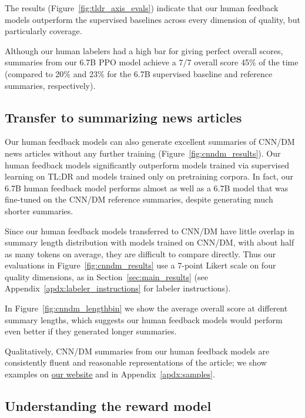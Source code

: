 The results (Figure~\ref{fig:tldr_axis_evals}) indicate that our human feedback models outperform the supervised baselines across every dimension of quality, but particularly coverage. 

Although our human labelers had a high bar for giving perfect overall scores, summaries from our 6.7B PPO model achieve a 7/7 overall score 45\% of the time (compared to 20\% and 23\% for the 6.7B supervised baseline and reference summaries, respectively). 

\subsection{Transfer to summarizing news articles}
\label{sec:cnndm}

Our human feedback models can also generate excellent summaries of CNN/DM news articles without any further training (Figure~\ref{fig:cnndm_results}). 
Our human feedback models significantly outperform models trained via supervised learning on TL;DR and models trained only on pretraining corpora. In fact, our 6.7B human feedback model performs almost as well as a 6.7B model that was fine-tuned on the CNN/DM reference summaries, despite generating much shorter summaries.

Since our human feedback models transferred to CNN/DM  have little overlap in summary length distribution with models trained on CNN/DM, with about half as many tokens on average, they are difficult to compare directly. Thus our evaluations in Figure~\ref{fig:cnndm_results} use a 7-point Likert scale on four quality dimensions, as in Section~\ref{sec:main_results} (see Appendix~\ref{apdx:labeler_instructions} for labeler instructions). 

In Figure~\ref{fig:cnndm_lengthbin} we show the average overall score at different summary lengths, which suggests our human feedback models would perform even better if they generated longer summaries.  

Qualitatively, CNN/DM summaries from our human feedback models are consistently fluent and reasonable representations of the article; we show examples on  \href{https://openaipublic.blob.core.windows.net/summarize-from-feedback/website/index.html}{our website} and in Appendix~\ref{apdx:samples}.

\subsection{Understanding the reward model}
\label{sec:understanding_rm}

